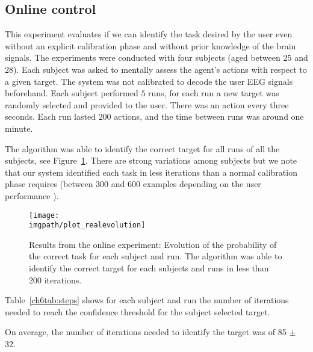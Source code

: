 \subsection{Online control}

This experiment evaluates if we can identify the task desired by the user even without an explicit calibration phase and without prior knowledge of the brain signals. The experiments were conducted with four subjects (aged between $25$ and $28$). Each subject was asked to mentally assess the agent's actions with respect to a given target. The system was not calibrated to decode the user EEG signals beforehand. Each subject performed $5$ runs, for each run a new target was randomly selected and provided to the user. There was an action every three seconds. Each run lasted $200$ actions, and the time between runs was around one minute.

The algorithm was able to identify the correct target for all runs of all the subjects, see Figure~\ref{fig:online_results}. There are strong variations among subjects but we note that our system identified each task in less iterations than a normal calibration phase requires (between 300 and 600 examples depending on the user performance \cite{chavarriaga2010learning,iturrate2010single}).

\begin{figure}[!htbp]
    \centering
    \texttt{[image: \\imgpath/plot\_realevolution]}    
    \caption{Results from the online experiment: Evolution of the probability of the correct task for each subject and run. The algorithm was able to identify the correct target for each subjects and runs in less than 200 iterations.}
    \label{fig:online_results} 
\end{figure}

Table~\ref{ch6tab:steps} shows for each subject and run the number of iterations needed to reach the confidence threshold for the subject selected target.

On average, the number of iterations needed to identify the target was of 85 $\pm$ 32.

